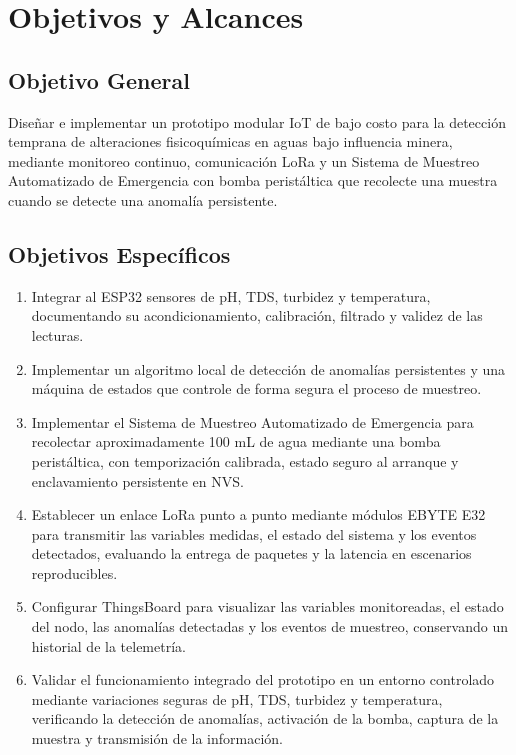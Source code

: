 \documentclass[11pt,a4paper]{article}
\begin{document}
\section{Objetivos y Alcances}

\subsection{Objetivo General}

Diseñar e implementar un prototipo modular IoT de bajo costo para la detección temprana de alteraciones fisicoquímicas en aguas bajo influencia minera, mediante monitoreo continuo, comunicación LoRa y un Sistema de Muestreo Automatizado de Emergencia con bomba peristáltica que recolecte una muestra cuando se detecte una anomalía persistente.

\subsection{Objetivos Específicos}

\begin{enumerate}
    \item Integrar al ESP32 sensores de pH, TDS, turbidez y temperatura, documentando su acondicionamiento, calibración, filtrado y validez de las lecturas.

    \item Implementar un algoritmo local de detección de anomalías persistentes y una máquina de estados que controle de forma segura el proceso de muestreo.

    \item Implementar el Sistema de Muestreo Automatizado de Emergencia para recolectar aproximadamente 100 mL de agua mediante una bomba peristáltica, con temporización calibrada, estado seguro al arranque y enclavamiento persistente en NVS.

    \item Establecer un enlace LoRa punto a punto mediante módulos EBYTE E32 para transmitir las variables medidas, el estado del sistema y los eventos detectados, evaluando la entrega de paquetes y la latencia en escenarios reproducibles.

    \item Configurar ThingsBoard para visualizar las variables monitoreadas, el estado del nodo, las anomalías detectadas y los eventos de muestreo, conservando un historial de la telemetría.

    \item Validar el funcionamiento integrado del prototipo en un entorno controlado mediante variaciones seguras de pH, TDS, turbidez y temperatura, verificando la detección de anomalías, activación de la bomba, captura de la muestra y transmisión de la información.
\end{enumerate}
\end{document}
